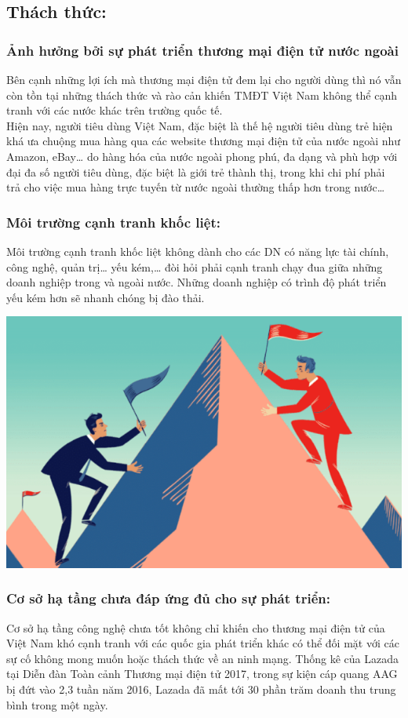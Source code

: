 \documentclass[13pt,a4paper]{article}
\begin{document}
\subsection{Thách thức:}
    \subsubsection{Ảnh hưởng bởi sự phát triển thương mại điện tử nước ngoài}
    Bên cạnh những lợi ích mà thương mại điện tử đem lại cho người dùng thì nó vẫn còn tồn tại những thách thức và rào cản khiến TMĐT Việt Nam không thể cạnh tranh với các nước khác trên trường quốc tế.\\ 
    Hiện nay, người tiêu dùng Việt Nam, đặc biệt là thế hệ người tiêu dùng trẻ hiện khá ưa chuộng mua hàng qua các website thương mại điện tử của nước ngoài như Amazon, eBay… do hàng hóa của nước ngoài phong phú, đa dạng và phù hợp với đại đa số người tiêu dùng, đặc biệt là giới trẻ thành thị, trong khi chi phí phải trả cho việc mua hàng trực tuyến từ nước ngoài thường thấp hơn trong nước…
    \subsubsection{Môi trường cạnh tranh khốc liệt:}
     Môi trường cạnh tranh khốc liệt không dành cho các DN có năng lực tài chính, công nghệ, quản trị… yếu kém,… đòi hỏi phải cạnh tranh chạy đua giữa những doanh nghiệp trong và ngoài nước. Những doanh nghiệp có trình độ phát triển yếu kém hơn sẽ nhanh chóng bị đào thải. 
     \begin{center}
    \includegraphics[scale=0.65]{images/thach.png} 
    \fontsize{10pt}{1.2pt}\selectfont
    \end{center}
    \subsubsection{Cơ sở hạ tầng chưa đáp ứng đủ cho sự phát triển:}
    Cơ sở hạ tầng công nghệ chưa tốt không chỉ khiến cho thương mại điện tử của Việt Nam khó cạnh tranh với các quốc gia phát triển khác có thể đối mặt với các sự cố không mong muốn hoặc thách thức về an ninh mạng. Thống kê của Lazada tại Diễn đàn Toàn cảnh Thương mại điện tử 2017, trong sự kiện cáp quang AAG bị đứt vào 2,3 tuần năm 2016, Lazada đã mất tới 30 phần trăm doanh thu trung bình trong một ngày.
\end{document}
